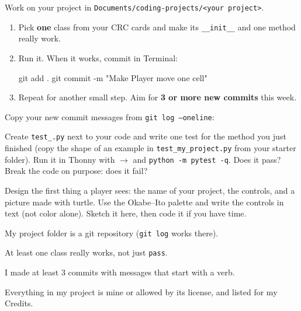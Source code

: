 \namedateline

\begin{core}
Work on your project in \texttt{Documents/coding-projects/<your project>}.
\begin{enumerate}[itemsep=1pt]
  \item Pick \textbf{one} class from your CRC cards and make its \texttt{\_\_init\_\_} and one method really work.
  \item Run it. When it works, commit in Terminal:
\begin{shellcode}
git add .
git commit -m "Make Player move one cell"
\end{shellcode}
  \item Repeat for another small step. Aim for \textbf{3 or more new commits} this week.
\end{enumerate}
Copy your new commit messages from \texttt{git log --oneline}:
\end{core}

\begin{challenge}
Create \texttt{test\_<your project>.py} next to your code and write one test for the method you just finished (copy the shape of an example in \texttt{test\_my\_project.py} from your starter folder). Run it in Thonny with  $\rightarrow$  and \texttt{python -m pytest -q}. Does it pass? Break the code on purpose: does it fail?
\end{challenge}

\begin{creative}
Design the first thing a player sees: the name of your project, the controls, and a picture made with turtle. Use the Okabe--Ito palette and write the controls in text (not color alone). Sketch it here, then code it if you have time.
\answerspace{4cm}
\end{creative}

\begin{selfcheck}
  \item My project folder is a git repository (\texttt{git log} works there).
  \item At least one class really works, not just \texttt{pass}.
  \item I made at least 3 commits with messages that start with a verb.
  \item Everything in my project is mine or allowed by its license, and listed for my Credits.
\end{selfcheck}
